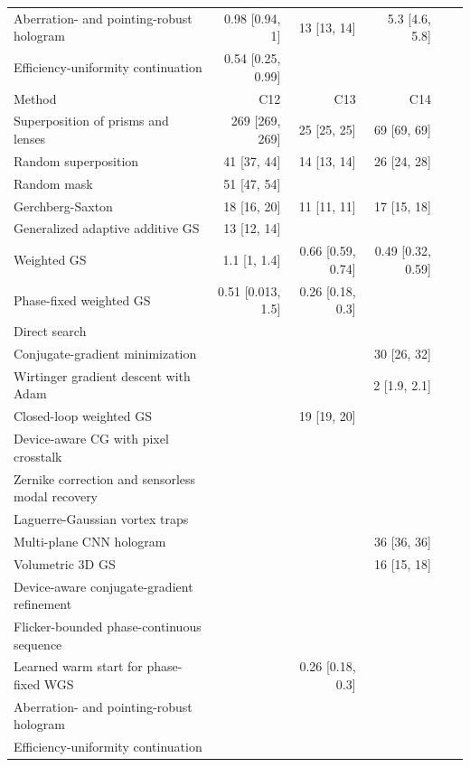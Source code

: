 \begin{longtable}{@{}>{\raggedright\arraybackslash}p{} rrrrr@{}}
Aberration- and pointing-robust hologram & 0.98 [0.94, 1] & 13 [13, 14] & 5.3 [4.6, 5.8] &  &\\
Efficiency-uniformity continuation & 0.54 [0.25, 0.99] &  &  &  &\\
\midrule
Method & C12 & C13 & C14 & &\\
\midrule
Superposition of prisms and lenses & 269 [269, 269] & 25 [25, 25] & 69 [69, 69] & &\\
Random superposition & 41 [37, 44] & 14 [13, 14] & 26 [24, 28] & &\\
Random mask & 51 [47, 54] &  &  & &\\
Gerchberg-Saxton & 18 [16, 20] & 11 [11, 11] & 17 [15, 18] & &\\
Generalized adaptive additive GS & 13 [12, 14] &  &  & &\\
Weighted GS & 1.1 [1, 1.4] & 0.66 [0.59, 0.74] & 0.49 [0.32, 0.59] & &\\
Phase-fixed weighted GS & 0.51 [0.013, 1.5] & 0.26 [0.18, 0.3] &  & &\\
Direct search &  &  &  & &\\
Conjugate-gradient minimization &  &  & 30 [26, 32] & &\\
Wirtinger gradient descent with Adam &  &  & 2 [1.9, 2.1] & &\\
Closed-loop weighted GS &  & 19 [19, 20] &  & &\\
Device-aware CG with pixel crosstalk &  &  &  & &\\
Zernike correction and sensorless modal recovery &  &  &  & &\\
Laguerre-Gaussian vortex traps &  &  &  & &\\
Multi-plane CNN hologram &  &  & 36 [36, 36] & &\\
Volumetric 3D GS &  &  & 16 [15, 18] & &\\
Device-aware conjugate-gradient refinement &  &  &  & &\\
Flicker-bounded phase-continuous sequence &  &  &  & &\\
Learned warm start for phase-fixed WGS &  & 0.26 [0.18, 0.3] &  & &\\
Aberration- and pointing-robust hologram &  &  &  & &\\
Efficiency-uniformity continuation &  &  &  & &\\
\bottomrule\end{longtable}
\endgroup
